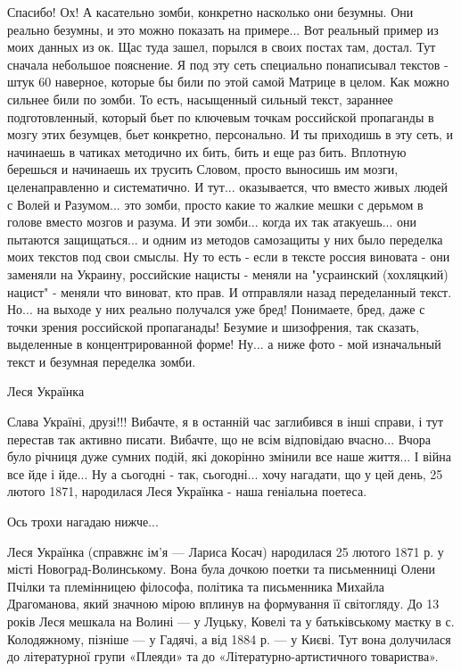 Спасибо! Ох! А касательно зомби, конкретно насколько они безумны. Они реально
безумны, и это можно показать на примере... Вот реальный пример из моих данных
из ок. Щас туда зашел, порылся в своих постах там, достал. Тут сначала
небольшое пояснение. Я под эту сеть специально понаписывал текстов - штук 60
наверное, которые бы били по этой самой Матрице в целом. Как можно сильнее били
по зомби. То есть, насыщенный сильный текст, зараннее подготовленный, который
бьет по ключевым точкам российской пропаганды в мозгу этих безумцев, бьет
конкретно, персонально. И ты приходишь в эту сеть, и начинаешь в чатиках
методично их бить, бить и еще раз бить. Вплотную берешься и начинаешь их
трусить Словом, просто выносишь им мозги, целенаправленно и систематично. И
тут... оказывается, что вместо живых людей с Волей и Разумом... это зомби,
просто какие то жалкие мешки с дерьмом в голове вместо мозгов и разума.  И эти
зомби... когда их так атакуешь... они пытаются защищаться... и одним из методов
самозащиты у них было переделка моих текстов под свои смыслы. Ну то есть - если
в тексте россия виновата - они заменяли на Украину, российские нацисты - меняли
на "усраинский (хохляцкий) нацист" - меняли что виноват, кто прав.  И
отправляли назад переделанный текст. Но... на выходе у них реально получался
уже бред! Понимаете, бред, даже с точки зрения российской пропаганады! Безумие
и шизофрения, так сказать, выделенные в концентрированной форме! Ну... а ниже
фото - мой изначальный текст и безумная переделка зомби.

Леся Українка 💛 💙 💛 💙 💛 💙 💛 💙        

Слава Україні, друзі!!! Вибачте, я в останній час заглибився в інші справи, і тут перестав так активно писати. Вибачте, що не всім відповідаю вчасно... Вчора було річниця дуже сумних подій, які докорінно змінили все наше життя... І війна все йде і йде... Ну а сьогодні - так, сьогодні... хочу нагадати, що у цей день, 25 лютого 1871, народилася Леся Українка - наша геніальна поетеса.

Ось трохи нагадаю нижче...

Леся Українка (справжнє ім’я — Лариса Косач) народилася 25 лютого 1871 р. у місті Новоград-Волинському. Вона була дочкою поетки та письменниці Олени Пчілки та племінницею філософа, політика та письменника Михайла Драгоманова, який значною мірою вплинув на формування її світогляду. До 13 років Леся мешкала на Волині — у Луцьку, Ковелі та у батьківському маєтку в с. Колодяжному, пізніше — у Гадячі, а від 1884 р. — у Києві. Тут вона долучилася до літературної групи «Плеяди» та до «Літературно-артистичного товариства».

